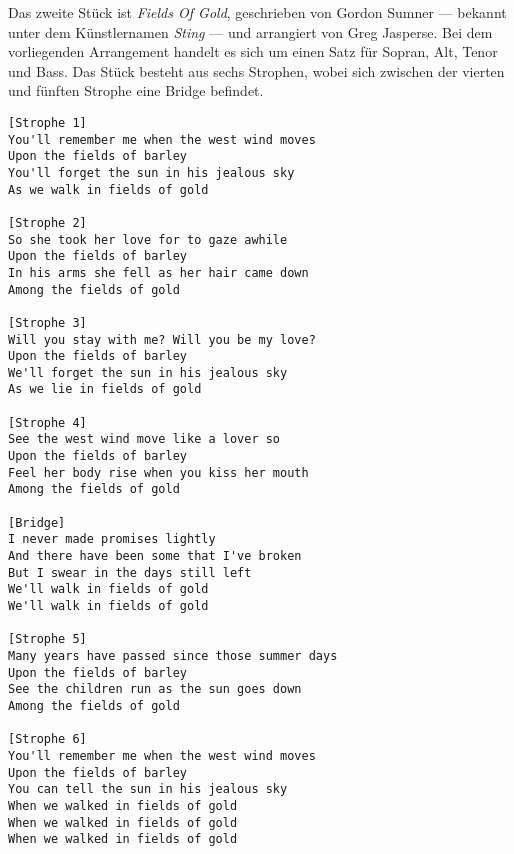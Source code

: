 Das zweite Stück ist \textit{Fields Of Gold}, geschrieben von Gordon Sumner — bekannt unter dem Künstlernamen \textit{Sting} — und arrangiert von Greg Jasperse. Bei dem vorliegenden Arrangement handelt es sich um einen Satz für Sopran, Alt, Tenor und Bass. Das Stück besteht aus sechs Strophen, wobei sich zwischen der vierten und fünften Strophe eine Bridge befindet.

\begin{verbatim}
[Strophe 1]
You'll remember me when the west wind moves
Upon the fields of barley
You'll forget the sun in his jealous sky
As we walk in fields of gold

[Strophe 2]
So she took her love for to gaze awhile
Upon the fields of barley
In his arms she fell as her hair came down
Among the fields of gold

[Strophe 3]
Will you stay with me? Will you be my love?
Upon the fields of barley
We'll forget the sun in his jealous sky
As we lie in fields of gold

[Strophe 4]
See the west wind move like a lover so
Upon the fields of barley
Feel her body rise when you kiss her mouth
Among the fields of gold

[Bridge]
I never made promises lightly
And there have been some that I've broken
But I swear in the days still left
We'll walk in fields of gold
We'll walk in fields of gold

[Strophe 5]
Many years have passed since those summer days
Upon the fields of barley
See the children run as the sun goes down
Among the fields of gold

[Strophe 6]
You'll remember me when the west wind moves
Upon the fields of barley
You can tell the sun in his jealous sky
When we walked in fields of gold
When we walked in fields of gold
When we walked in fields of gold
\end{verbatim}